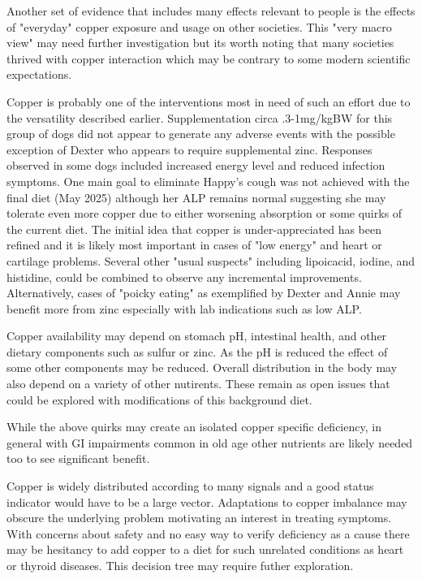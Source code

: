 Another set of evidence that includes many effects relevant
to people is the effects of "everyday" copper exposure and usage on
other societies.  This "very macro view" may need further investigation
but its worth noting that many societies thrived with copper
interaction which may be contrary to some modern scientific expectations.



Copper is probably one of the interventions most in need of such an effort
due to the versatility described earlier. 
Supplementation circa .3-1mg/kgBW for this group of dogs
did not appear to generate any adverse events with the possible
exception of Dexter who appears to require supplemental zinc. 
Responses observed in some dogs included increased energy level and  reduced 
infection symptoms.
One main goal to eliminate Happy's
cough was not achieved with the final diet (May 2025)  although her ALP
remains normal suggesting she may tolerate  even more copper
due to either worsening absorption or some quirks of the current diet.
The initial idea that copper is under-appreciated has been 
refined and it is likely most important in cases of "low energy"
and heart or cartilage problems. 
Several other "usual suspects" including lipoicacid, iodine,
and histidine,  could be combined to observe any incremental improvements. 
Alternatively, cases of
"poicky eating" as exemplified by Dexter and Annie may benefit
more from zinc especially with lab indications such as low ALP. 


Copper availability may depend on stomach pH, intestinal health,
 and other dietary
components such as sulfur or zinc. As the pH is reduced the effect of
some other components may be reduced. Overall distribution in the body
may also depend on a variety of other nutirents.  These remain as open
issues that could be explored with modifications of this background diet.

While the above quirks may create an isolated copper specific deficiency,
in general with GI impairments common in old age other nutrients
are likely needed too to see significant benefit.

Copper is widely distributed according to many signals and
a good status indicator would have to be a large vector.
Adaptations to copper imbalance may obscure the underlying problem
motivating an interest in treating symptoms. With concerns about
safety and no easy way to verify deficiency as a cause there may
be hesitancy to add copper to a diet for such unrelated conditions
as heart or thyroid diseases.  This decision tree may 
require futher exploration. 

